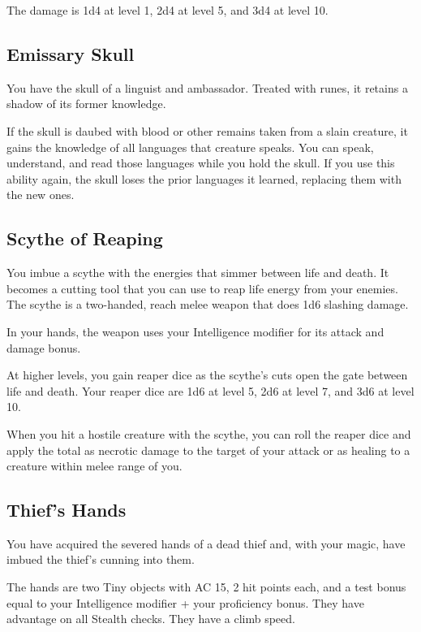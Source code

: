 \documentclass[12pt,letterpaper,twocolumn,openany,nodeprecatedcode,bg=none]{dndbook}
\let\oldsubsection\subsection
\renewcommand{\subsection}[1]{%
  \needspace{5\baselineskip}%
  \oldsubsection{#1}%
}
\begin{document}
The damage is 1d4 at level 1, 2d4 at level 5, and 3d4 at level 10.

\subsection{Emissary Skull}\label{emissary-skull}

You have the skull of a linguist and ambassador. Treated with runes, it
retains a shadow of its former knowledge.

If the skull is daubed with blood or other remains taken from a slain
creature, it gains the knowledge of all languages that creature speaks.
You can speak, understand, and read those languages while you hold the
skull. If you use this ability again, the skull loses the prior
languages it learned, replacing them with the new ones.

\subsection{Scythe of Reaping}\label{scythe-of-reaping}

You imbue a scythe with the energies that simmer between life and death.
It becomes a cutting tool that you can use to reap life energy from your
enemies. The scythe is a two-handed, reach melee weapon that does 1d6
slashing damage.

In your hands, the weapon uses your Intelligence modifier for its attack
and damage bonus.

At higher levels, you gain reaper dice as the scythe's cuts open the
gate between life and death. Your reaper dice are 1d6 at level 5, 2d6 at
level 7, and 3d6 at level 10.

When you hit a hostile creature with the scythe, you can roll the reaper
dice and apply the total as necrotic damage to the target of your attack
or as healing to a creature within melee range of you.

\subsection{Thief's Hands}\label{thiefs-hands}

You have acquired the severed hands of a dead thief and, with your
magic, have imbued the thief's cunning into them.

The hands are two Tiny objects with AC 15, 2 hit points each, and a test
bonus equal to your Intelligence modifier + your proficiency bonus. They
have advantage on all Stealth checks. They have a climb speed.
\end{document}
